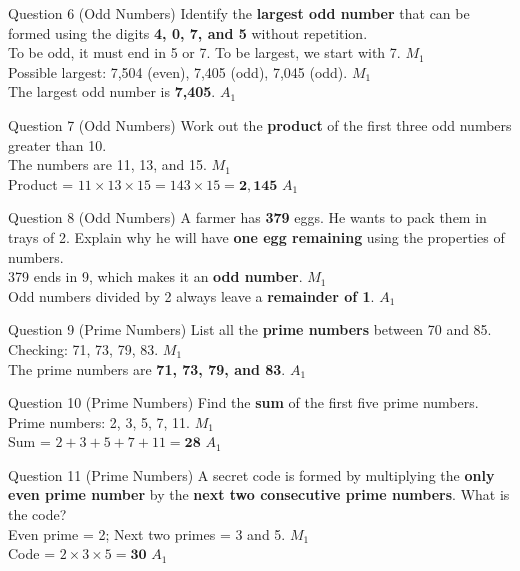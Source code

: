 \documentclass[12pt, a4paper, oneside]{article}
\begin{document}
\begin{solvingbox}{Question 6 (Odd Numbers)}
Identify the \textbf{largest odd number} that can be formed using the digits \textbf{4, 0, 7, and 5} without repetition. \\
To be odd, it must end in 5 or 7. To be largest, we start with 7. \hfill $M_1$ \\
Possible largest: 7,504 (even), 7,405 (odd), 7,045 (odd). \hfill $M_1$ \\
The largest odd number is \textbf{7,405}. \hfill $A_1$
\end{solvingbox}

\begin{solvingbox}{Question 7 (Odd Numbers)}
Work out the \textbf{product} of the first three odd numbers greater than 10. \\
The numbers are 11, 13, and 15. \hfill $M_1$ \\
Product = $11 \times 13 \times 15 = 143 \times 15 = \mathbf{2,145}$ \hfill $A_1$
\end{solvingbox}

\begin{solvingbox}{Question 8 (Odd Numbers)}
A farmer has \textbf{379} eggs. He wants to pack them in trays of 2. Explain why he will have \textbf{one egg remaining} using the properties of numbers. \\
379 ends in 9, which makes it an \textbf{odd number}. \hfill $M_1$ \\
Odd numbers divided by 2 always leave a \textbf{remainder of 1}. \hfill $A_1$
\end{solvingbox}

\begin{solvingbox}{Question 9 (Prime Numbers)}
List all the \textbf{prime numbers} between 70 and 85. \\
Checking: 71, 73, 79, 83. \hfill $M_1$ \\
The prime numbers are \textbf{71, 73, 79, and 83}. \hfill $A_1$
\end{solvingbox}

\begin{solvingbox}{Question 10 (Prime Numbers)}
Find the \textbf{sum} of the first five prime numbers. \\
Prime numbers: 2, 3, 5, 7, 11. \hfill $M_1$ \\
Sum = $2 + 3 + 5 + 7 + 11 = \mathbf{28}$ \hfill $A_1$
\end{solvingbox}

\begin{solvingbox}{Question 11 (Prime Numbers)}
A secret code is formed by multiplying the \textbf{only even prime number} by the \textbf{next two consecutive prime numbers}. What is the code? \\
Even prime = 2; Next two primes = 3 and 5. \hfill $M_1$ \\
Code = $2 \times 3 \times 5 = \mathbf{30}$ \hfill $A_1$
\end{solvingbox}
\end{document}
